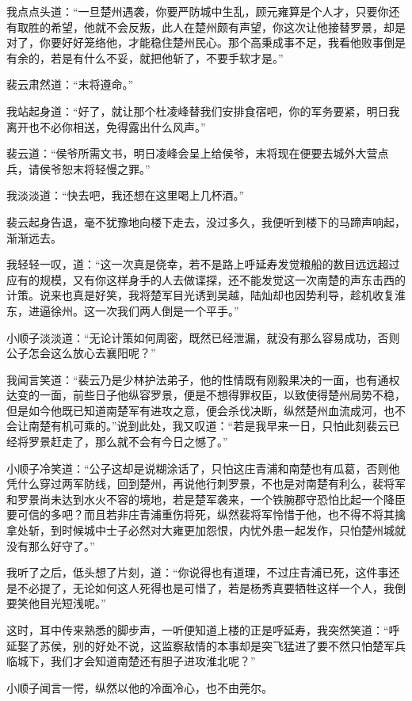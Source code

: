 我点点头道：“一旦楚州遇袭，你要严防城中生乱，顾元雍算是个人才，只要你还有取胜的希望，他就不会反叛，此人在楚州颇有声望，你这次让他接替罗景，却是对了，你要好好笼络他，才能稳住楚州民心。那个高秉成事不足，我看他败事倒是有余的，若是有什么不妥，就把他斩了，不要手软才是。”

裴云肃然道：“末将遵命。”

我站起身道：“好了，就让那个杜凌峰替我们安排食宿吧，你的军务要紧，明日我离开也不必你相送，免得露出什么风声。”

裴云道：“侯爷所需文书，明日凌峰会呈上给侯爷，末将现在便要去城外大营点兵，请侯爷恕末将轻慢之罪。”

我淡淡道：“快去吧，我还想在这里喝上几杯酒。”

裴云起身告退，毫不犹豫地向楼下走去，没过多久，我便听到楼下的马蹄声响起，渐渐远去。

我轻轻一叹，道：“这一次真是侥幸，若不是路上呼延寿发觉粮船的数目远远超过应有的规模，又有你这样身手的人去做谍探，还不能发觉这一次南楚的声东击西的计策。说来也真是好笑，我将楚军目光诱到吴越，陆灿却也因势利导，趁机收复淮东，进逼徐州。这一次我们两人倒是一个平手。”

小顺子淡淡道：“无论计策如何周密，既然已经泄漏，就没有那么容易成功，否则公子怎会这么放心去襄阳呢？”

我闻言笑道：“裴云乃是少林护法弟子，他的性情既有刚毅果决的一面，也有通权达变的一面，前些日子他纵容罗景，便是不想得罪权臣，以致使得楚州局势不稳，但是如今他既已知道南楚军有进攻之意，便会杀伐决断，纵然楚州血流成河，也不会让南楚有机可乘的。”说到此处，我又叹道：“若是我早来一日，只怕此刻裴云已经将罗景赶走了，那么就不会有今日之憾了。”

小顺子冷笑道：“公子这却是说糊涂话了，只怕这庄青浦和南楚也有瓜葛，否则他凭什么穿过两军防线，回到楚州，再说他行刺罗景，不也是对南楚有利么，裴将军和罗景尚未达到水火不容的境地，若是楚军袭来，一个铁腕郡守恐怕比起一个降臣要可信的多吧？而且若非庄青浦重伤将死，纵然裴将军怜惜于他，也不得不将其擒拿处斩，到时候城中士子必然对大雍更加怨恨，内忧外患一起发作，只怕楚州城就没有那么好守了。”

我听了之后，低头想了片刻，道：“你说得也有道理，不过庄青浦已死，这件事还是不必提了，无论如何这人死得也是可惜了，若是杨秀真要牺牲这样一个人，我倒要笑他目光短浅呢。”

这时，耳中传来熟悉的脚步声，一听便知道上楼的正是呼延寿，我突然笑道：“呼延娶了苏侯，别的好处不说，这监察敌情的本事却是突飞猛进了要不然只怕楚军兵临城下，我们才会知道南楚还有胆子进攻淮北呢？”

小顺子闻言一愕，纵然以他的冷面冷心，也不由莞尔。

